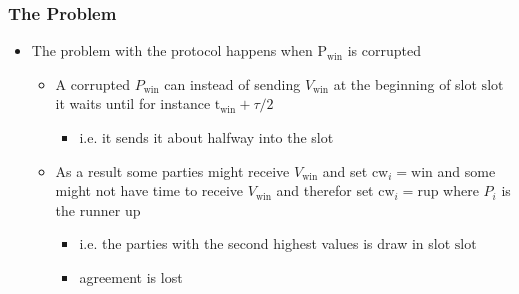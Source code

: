 \documentclass[11pt]{article}
\begin{document}
\subsubsection{The Problem}
\label{sec:orgc0c911f}
\begin{itemize}
\item The problem with the protocol happens when \(\text{P}_\text{win}\) is corrupted
\begin{itemize}
\item A corrupted \(P_\text{win}\) can instead of sending \(V_\text{win}\) at the beginning of slot \(\text{slot}\) it waits until for instance \(\text{t}_\text{win}+\tau/2\)
\begin{itemize}
\item i.e. it sends it about halfway into the slot
\end{itemize}
\item As a result some parties might receive \(V_\text{win}\) and set \(\text{cw}_i = \text{win}\) and some might not have time to receive \(V_\text{win}\) and therefor set \(\text{cw}_i = \text{rup}\) where \(P_i\) is the runner up
\begin{itemize}
\item i.e. the parties with the second highest values is draw in slot \(\text{slot}\)
\item agreement is lost
\end{itemize}
\end{itemize}
\end{itemize}
\end{document}

